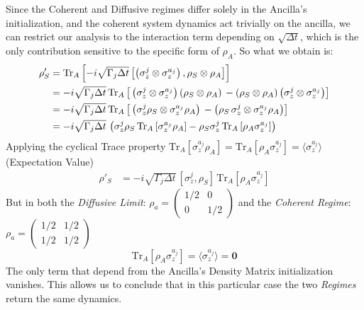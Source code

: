 \documentclass[a4paper,12pt]{article}
\begin{document}
	Since the Coherent and Diffusive regimes differ solely in the Ancilla's initialization, and the coherent system dynamics act trivially on the ancilla, we can restrict our analysis to the interaction term depending on $ \sqrt{\Delta t} $, which is the only contribution sensitive to the specific form of $\rho_A$. So what we obtain is:
	\begin{align}
		\rho'_{S} &= \text{Tr}_A \left[- i \sqrt{\Gamma_j \Delta t} \left[ \left( \sigma_{z}^{j} \otimes \sigma_{z}^{a_j} \right) , \rho_{S} \otimes \rho_{A} \right] \right] \notag \\
		&= - i \sqrt{\Gamma_j \Delta t} \, \text{Tr}_A \left[ \, \left(\sigma_{z}^{j} \otimes \sigma_{z}^{a_j} \right) \left(\rho_{S} \otimes \rho_{A}\right) \, - \left(\rho_{S} \otimes \rho_{A}\right) \left(\sigma_{z}^{j} \otimes \sigma_{z}^{a_j} \right) \right] \notag \\
		&= - i \sqrt{\Gamma_j \Delta t} \, \text{Tr}_A \left[ \, \left(\sigma_{z}^{j} \rho_{S} \otimes \sigma_{z}^{a_j} \rho_{A} \right) \, - \left(\rho_{S} \, \sigma_{z}^{j}  \otimes \sigma_{z}^{a_j} \rho_{A} \right) \right] \notag \\
		&= - i \sqrt{\Gamma_j \Delta t} \, \left( \sigma_{z}^{j} \rho_{S} \, \text{Tr}_A \left[ \sigma_{z}^{a_j} \rho_{A} \right] - \rho_{S} \sigma_{z}^{j}  \, \text{Tr}_A \left[ \rho_{A} \sigma_{z}^{a_j} \right] \right) \notag
	\end{align}
	Applying the cyclical Trace property $ \text{Tr}_A \left[ \sigma_{z}^{a_j} \rho_{A} \right] = \text{Tr}_A \left[ \rho_{A} \sigma_{z}^{a_j} \right] = \langle \sigma_{z}^{a_j} \rangle $ (Expectation Value)
	\begin{align}
		\rho'_{S} &= - i \sqrt{\Gamma_j \Delta t} \, \left[ \sigma_{z}^{j}, \rho_{S} \right] \, \text{Tr}_A \left[ \rho_{A} \sigma_{z}^{a_j} \right]
		\label{eq:rho_evo_single_term_U_expansions}
	\end{align}
	But in both the \textit{Diffusive Limit}: $ \rho_{a} = \begin{pmatrix} 1/2 & 0 \\ 0 & 1/2 \end{pmatrix} $ and the \textit{Coherent Regime}: $ \rho_{a} = \begin{pmatrix} 1/2 & 1/2 \\ 1/2 & 1/2 \end{pmatrix} $
	\begin{equation}
		\text{Tr}_A \left[ \rho_{A} \sigma_{z}^{a_j} \right] = \langle \sigma_{z}^{a_j} \rangle = \textbf{0}
		\label{eq:final_trace_to_0}
	\end{equation}
	The only term that depend from the Ancilla's Density Matrix initialization vanishes. This allows us to conclude that in this particular case the two \textit{Regimes} return the same dynamics.\\
\end{document}
